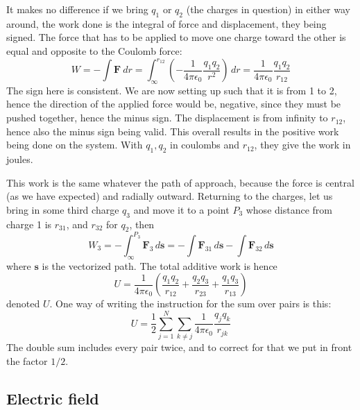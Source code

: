 It makes no difference if we bring $q_{1}$ or $q_{2}$ (the charges in question) in either way around, the work done is the integral of force and displacement, they being signed. The force that has to be applied to move one charge toward the other is equal and opposite to the Coulomb force: 
$$W=-\int \mathbf{F} \: dr = \int^{r_{12}}_{\infty} \left( -\frac{1}{4\pi \epsilon_{0}} \frac{q_{1}q_{2}}{r^{2}} \right) \, dr = \frac{1}{4\pi \epsilon_{0}} \frac{q_{1}q_{2}}{r_{12}}  $$
The sign here is consistent. We are now setting up such that it is from 1 to 2, hence the direction of the applied force would be, negative, since they must be pushed together, hence the minus sign. The displacement is from infinity to $r_{12}$, hence also the minus sign being valid. This overall results in the positive work being done on the system. With $q_{1},q_{2}$ in coulombs and $r_{12}$, they give the work in joules. 

This work is the same whatever the path of approach, because the force is central (as we have expected) and radially outward. Returning to the charges, let us bring in some third charge $q_{3}$ and move it to a point $P_{3}$ whose distance from charge 1 is $r_{31}$, and $r_{32}$ for $q_{2}$, then $$W_{3}=-\int^{P_{3}}_{\infty} \mathbf{F}_{3} \, d\mathbf{s} = - \int \mathbf{F}_{31}  \, d\mathbf{s} - \int \mathbf{F}_{32} \, d\mathbf{s}   $$
where $\mathbf{s}$ is the vectorized path. The total additive work is hence $$U= \frac{1}{4\pi \epsilon_{0}}\left( \frac{q_{1}q_{2}}{r_{12}} + \frac{q_{2}q_{3}}{r_{23}} + \frac{q_{1}q_{3}}{r_{13}} \right)$$
denoted $U$. One way of writing the instruction for the sum over pairs is this: $$U=\frac{1}{2}\sum^{N}_{j=1}\sum_{k\neq j} \frac{1}{4\pi \epsilon_{0}} \frac{q_{j}q_{k}}{r_{jk}}$$The double sum includes every pair twice, and to correct for that we put in front the factor $1/2$. 

\subsection{Electric field}

